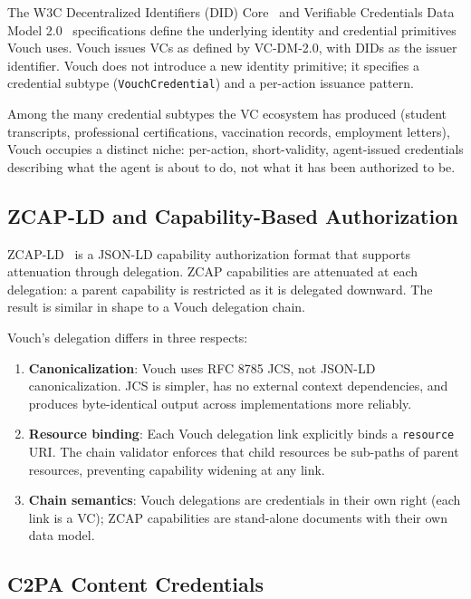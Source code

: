 \documentclass[11pt,a4paper,twocolumn]{article}
\begin{document}
The W3C Decentralized Identifiers (DID) Core~\cite{w3cdidcore} and Verifiable Credentials Data Model 2.0~\cite{w3cvcdm2} specifications define the underlying identity and credential primitives Vouch uses. Vouch issues VCs as defined by VC-DM-2.0, with DIDs as the issuer identifier. Vouch does not introduce a new identity primitive; it specifies a credential subtype (\texttt{VouchCredential}) and a per-action issuance pattern.

Among the many credential subtypes the VC ecosystem has produced (student transcripts, professional certifications, vaccination records, employment letters), Vouch occupies a distinct niche: per-action, short-validity, agent-issued credentials describing what the agent is about to do, not what it has been authorized to be.

\subsection{ZCAP-LD and Capability-Based Authorization}

ZCAP-LD~\cite{zcapld} is a JSON-LD capability authorization format that supports attenuation through delegation. ZCAP capabilities are attenuated at each delegation: a parent capability is restricted as it is delegated downward. The result is similar in shape to a Vouch delegation chain.

Vouch's delegation differs in three respects:

\begin{enumerate}[label=\arabic*.,leftmargin=*]
\item \textbf{Canonicalization}: Vouch uses RFC 8785 JCS, not JSON-LD canonicalization. JCS is simpler, has no external context dependencies, and produces byte-identical output across implementations more reliably.
\item \textbf{Resource binding}: Each Vouch delegation link explicitly binds a \verb|resource| URI. The chain validator enforces that child resources be sub-paths of parent resources, preventing capability widening at any link.
\item \textbf{Chain semantics}: Vouch delegations are credentials in their own right (each link is a VC); ZCAP capabilities are stand-alone documents with their own data model.
\end{enumerate}

\subsection{C2PA Content Credentials}
\end{document}
